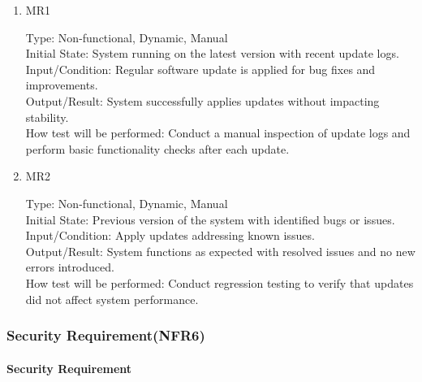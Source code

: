 \documentclass[12pt, titlepage]{article}
\begin{document}
\begin{enumerate}
    \item{MR1\\}
    
    Type: Non-functional, Dynamic, Manual\\
    
    Initial State: System running on the latest version with recent update logs.\\
    
    Input/Condition: Regular software update is applied for bug fixes and improvements.\\
    
    Output/Result: System successfully applies updates without impacting stability.\\
    
    How test will be performed: Conduct a manual inspection of update logs and perform basic functionality checks after each update.

    \item{MR2\\}
    
    Type: Non-functional, Dynamic, Manual\\

    Initial State: Previous version of the system with identified bugs or issues.\\

    Input/Condition: Apply updates addressing known issues.\\

    Output/Result: System functions as expected with resolved issues and no new errors introduced.\\

    How test will be performed: Conduct regression testing to verify that updates did not affect system performance.
\end{enumerate}

\subsubsection{Security Requirement(NFR6)}

\paragraph{Security Requirement}
\end{document}

